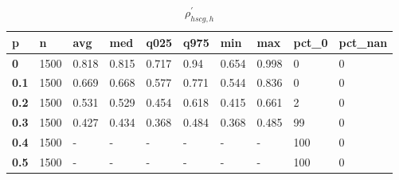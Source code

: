 \begin{table}[h]
 \centering 
\footnotesize
\caption{$\rho_{hscg,h}^\prime $}
\label{tab:alphahscgh}
\begin{tabular}[h]{|l|l|l|l|l|l|l|l|l|l|
    } \hline
\textbf{ p} & \textbf{ n} & \textbf{ avg} & \textbf{ med} & \textbf{ q025} & \textbf{ q975} & \textbf{ min} & \textbf{ max} & \textbf{ pct\_0} & \textbf{ pct\_nan}
    \\ \hline
  \textbf{  0} & 1500 & 0.818 & 0.815 & 0.717 &  0.94 & 0.654 & 0.998 &   0 & 0
    \\ \hline
  \textbf{0.1} & 1500 & 0.669 & 0.668 & 0.577 & 0.771 & 0.544 & 0.836 &   0 & 0
    \\ \hline
  \textbf{0.2} & 1500 & 0.531 & 0.529 & 0.454 & 0.618 & 0.415 & 0.661 &   2 & 0
    \\ \hline
  \textbf{0.3} & 1500 & 0.427 & 0.434 & 0.368 & 0.484 & 0.368 & 0.485 &  99 & 0
    \\ \hline
  \textbf{0.4} & 1500 & - & - & - & - & - & - & 100 & 0
    \\ \hline
  \textbf{0.5} & 1500 & - & - & - & - & - & - & 100 & 0
    \\ \hline
 \end{tabular}
 \end{table}
